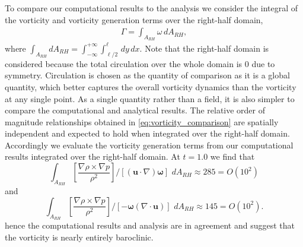 \documentclass{jfm}%
\newcommand{\orderof}[1]{\ensuremath{\textit{O}\left(#1\right)}}
\begin{document}
To compare our computational results to the analysis we consider the
integral of the vorticity and vorticity generation terms over the
right-half domain,
\begin{align}
  \Gamma = \int_{A_{RH}} \omega \,dA_{RH},
\end{align}
where
$\int_{A_{RH}} dA_{RH} =
\int_{-\infty}^{+\infty}\int_{\ell/2}^{\ell} \,dy\, dx$. Note
that the right-half domain is considered because the total circulation
over the whole domain is $0$ due to symmetry. Circulation is chosen as
the quantity of comparison as it is a global quantity, which better
captures the overall vorticity dynamics than the vorticity at any
single point. As a single quantity rather than a field, it is also
simpler to compare the computational and analytical results. The
relative order of magnitude relationships obtained in
\eqref{eq:vorticity_comparison} are spatially independent and expected
to hold when integrated over the right-half domain. Accordingly we
evaluate the vorticity generation terms from our computational results
integrated over the right-half domain. At $t=1.0$ we find that %
$$ \int_{A_{RH}} \left[\frac{\nabla\rho\times\nabla p}{\rho^2}\right] / \left[\left(\boldsymbol{u}\cdot\nabla\right)\boldsymbol{\omega}\right]\,\,dA_{RH}\approx 285=\orderof{10^2}$$
and
$$ \int_{A_{RH}} \left[\frac{\nabla\rho\times\nabla p}{\rho^2}\right] / \left[-\boldsymbol{\omega}\left(\nabla\cdot\boldsymbol{u}\right)\right]\,\,dA_{RH} \approx 145=\orderof{10^2}.$$
%
hence the computational results and analysis are in agreement and suggest
that the vorticity is nearly entirely baroclinic.
% 





\end{document}
